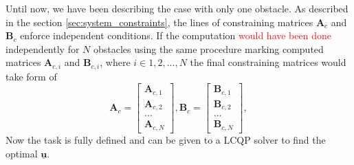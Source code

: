 \documentclass{article}
\begin{document}
Until now, we have been describing the case with only one obstacle. As described in the section \ref{sec:system_constraints}, the lines of constraining matrices $\textbf{A}_c$ and $\textbf{B}_c$  enforce independent conditions. If the computation \textcolor{red}{would have been done} independently for $N$ obstacles using the same procedure marking computed matrices $\textbf{A}_{c,i}$ and $\textbf{B}_{c,i}$, where $i \in {1, 2, ..., N}$ the final constraining matrices would take form of
\begin{equation}
\textbf{A}_c =
  \begin{bmatrix}
  \textbf{A}_{c,1} \\
  \textbf{A}_{c,2} \\
  ...	   \\
  \textbf{A}_{c,N}
  \end{bmatrix},\textbf{B}_c = \begin{bmatrix}
  \textbf{B}_{c,1} \\
  \textbf{B}_{c,2} \\
  ...	   \\
  \textbf{B}_{c,N}
  \end{bmatrix}, 
\end{equation}
Now the task is fully defined and can be given to a LCQP solver to find the optimal $\underline{\textbf{u}}$. 
\end{document}
